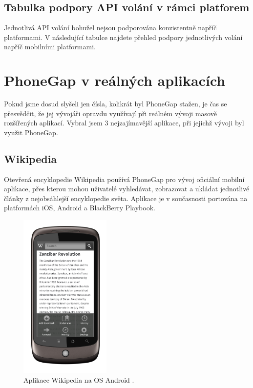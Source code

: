 \subsection{Tabulka podpory API volání v rámci platforem}
Jednotlivá API volání bohužel nejsou podporována konzistentně napříč platformami. V následující tabulce najdete přehled podpory jednotlivých volání napříč mobilními platformami.

\section{PhoneGap v reálných aplikacích}
Pokud jsme dosud slyšeli jen čísla, kolikrát byl PhoneGap stažen, je čas se přesvědčit, že jej vývojáři opravdu využívají při reálném vývoji masově rozšířených aplikací. Vybral jsem 3 nejzajímavější aplikace, při jejichž vývoji byl využit PhoneGap.

\subsection{Wikipedia}
Otevřená encyklopedie Wikipedia používá PhoneGap pro vývoj oficiální mobilní aplikace, přes kterou mohou uživatelé vyhledávat, zobrazovat a ukládat jednotlivé články z nejobsáhlejší encyklopedie světa. Aplikace je v současnosti portována na platformách iOS, Android a BlackBerry Playbook.

\begin{figure}[H]\centering
\includegraphics[width=0.4\textwidth]{wikipedia.png}
\caption{Aplikace Wikipedia na OS Android \cite{google_android_wikipedia}.}
\label{fig:WikipediaApp}
\end{figure} 

